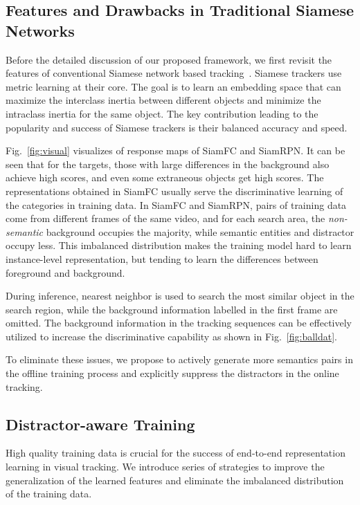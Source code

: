 \documentclass[runningheads]{llncs}
\begin{document}
\subsection{Features and Drawbacks in Traditional Siamese Networks}

\label{sect:figures}
Before the detailed discussion of our proposed framework, we first revisit the features of conventional Siamese network based tracking~\cite{SiamFC,SiamRPN}. Siamese trackers use metric learning at their core. The goal is to learn an embedding space that can maximize the interclass inertia between different objects and minimize the intraclass inertia for the same object. The key contribution leading to the popularity and success of Siamese trackers is their balanced accuracy and speed.



Fig.~\ref{fig:visual} visualizes of response maps of SiamFC and SiamRPN. It can be seen that for the targets, those with large differences in the background also achieve high scores, and even some extraneous objects get high scores. The representations obtained in SiamFC usually serve the discriminative learning of the categories in training data.
In SiamFC and SiamRPN, pairs of training data come from different frames of the same video, and for each search area, the \emph{non-semantic} background occupies the majority, while semantic entities and distractor occupy less. This imbalanced distribution makes the training model hard to learn instance-level representation, but tending to learn the differences between foreground and background.

During inference, nearest neighbor is used to search the most similar object in the search region, while the background information labelled in the first frame are omitted. The background information in the tracking sequences can be effectively utilized to increase the discriminative capability as shown in Fig.~\ref{fig:balldat}.

To eliminate these issues, we propose to actively generate more semantics pairs in the offline training process and explicitly suppress the distractors in the online tracking.


\subsection{Distractor-aware Training}

\label{sect:train}
High quality training data is crucial for the success of end-to-end representation learning in visual tracking. We introduce series of strategies to improve the generalization of the learned features and eliminate the imbalanced distribution of the training data.
\end{document}
